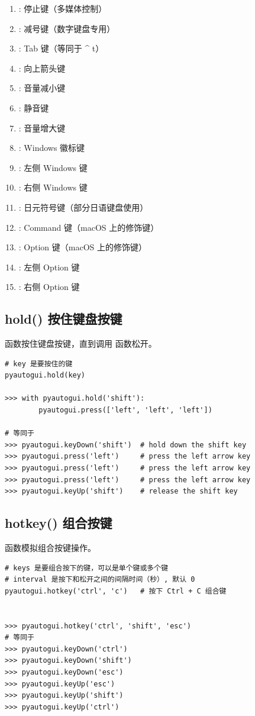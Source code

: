 \begin{enumerate}[label=\arabic*)]
    \item {}: 停止键（多媒体控制）
    \item {}: 减号键（数字键盘专用）
    \item {}: Tab 键（等同于 \^{} t）
    \item {}: 向上箭头键
    \item {}: 音量减小键
    \item {}: 静音键
    \item {}: 音量增大键
    \item {}: Windows 徽标键
    \item {}: 左侧 Windows 键
    \item {}: 右侧 Windows 键
    \item {}: 日元符号键（部分日语键盘使用）
    \item {}: Command 键（macOS 上的修饰键）
    \item {}: Option 键（macOS 上的修饰键）
    \item {}: 左侧 Option 键
    \item {}: 右侧 Option 键
\end{enumerate}


\subsection{hold() 按住键盘按键}
 函数按住键盘按键，直到调用  函数松开。
\begin{lstlisting}[style=demostyle,numbers=none]
# key 是要按住的键
pyautogui.hold(key)

>>> with pyautogui.hold('shift'):
        pyautogui.press(['left', 'left', 'left'])

# 等同于
>>> pyautogui.keyDown('shift')  # hold down the shift key
>>> pyautogui.press('left')     # press the left arrow key
>>> pyautogui.press('left')     # press the left arrow key
>>> pyautogui.press('left')     # press the left arrow key
>>> pyautogui.keyUp('shift')    # release the shift key
\end{lstlisting}

\subsection{hotkey() 组合按键}
 函数模拟组合按键操作。
\begin{lstlisting}[style=demostyle,numbers=none]
# keys 是要组合按下的键，可以是单个键或多个键
# interval 是按下和松开之间的间隔时间（秒）, 默认 0
pyautogui.hotkey('ctrl', 'c')   # 按下 Ctrl + C 组合键


>>> pyautogui.hotkey('ctrl', 'shift', 'esc')
# 等同于
>>> pyautogui.keyDown('ctrl')
>>> pyautogui.keyDown('shift')
>>> pyautogui.keyDown('esc')
>>> pyautogui.keyUp('esc')
>>> pyautogui.keyUp('shift')
>>> pyautogui.keyUp('ctrl')
\end{lstlisting}






